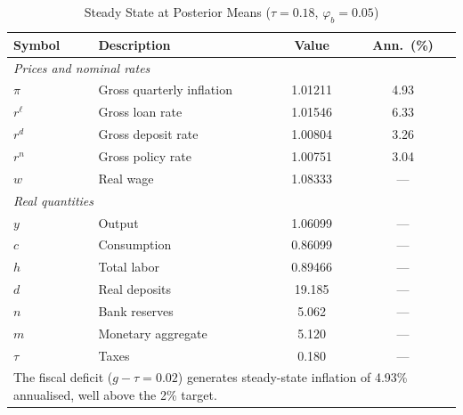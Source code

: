 \documentclass[]{article}
\begin{document}
\begin{table}[h]
\centering
\small
\begin{tabular}{llcc}
\toprule
Symbol & Description & Value & Ann.\ (\%) \\
\midrule
\multicolumn{4}{l}{\textit{Prices and nominal rates}} \\[2pt]
$\pi$          & Gross quarterly inflation    & 1.01211 & 4.93 \\
$r^\ell$       & Gross loan rate              & 1.01546 & 6.33 \\
$r^d$          & Gross deposit rate           & 1.00804 & 3.26 \\
$r^n$          & Gross policy rate            & 1.00751 & 3.04 \\
$w$            & Real wage                    & 1.08333 & ---  \\[4pt]
\multicolumn{4}{l}{\textit{Real quantities}} \\[2pt]
$y$    & Output                         & 1.06099  & --- \\
$c$    & Consumption                    & 0.86099  & --- \\
$h$    & Total labor                    & 0.89466  & --- \\
$d$    & Real deposits                  & 19.185   & --- \\
$n$    & Bank reserves                  &  5.062   & --- \\
$m$    & Monetary aggregate             &  5.120   & --- \\
$\tau$ & Taxes                          &  0.180   & --- \\
\bottomrule
\multicolumn{4}{l}{\parbox{0.82\linewidth}{\footnotesize The fiscal deficit ($g-\tau = 0.02$) generates steady-state inflation of 4.93\% annualised, well above the 2\% target.}}
\end{tabular}
\caption{Steady State at Posterior Means ($\tau = 0.18$, $\varphi_b = 0.05$)}
\label{tab:ss_018}
\end{table}

\end{document}
